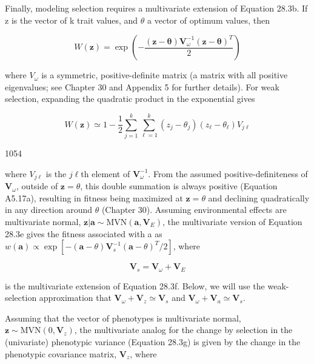 \documentclass{article}
\begin{document}
Finally, modeling selection requires a multivariate extension of Equation 28.3b. If z is the vector of k trait values, and  $ \theta $ a vector of optimum values, then

\begin{equation}
W(\mathbf{z})=\exp\left(-\frac{(\mathbf{z}-\boldsymbol{\theta})\mathbf{V}_{\omega}^{-1}(\mathbf{z}-\boldsymbol{\theta})^{T}}{2}\right)
\tag{28.36a}
\label{eq:28_36a}
\end{equation}

where  $ V_{\omega} $ is a symmetric, positive-definite matrix (a matrix with all positive eigenvalues; see Chapter 30 and Appendix 5 for further details). For weak selection, expanding the quadratic product in the exponential gives

\begin{equation}
W(\mathbf{z})\simeq1-\frac{1}{2}\sum_{j=1}^{k}\sum_{\ell=1}^{k}(z_{j}-\theta_{j})(z_{\ell}-\theta_{\ell})V_{j\ell}
\tag{28.36b}
\label{eq:28_36b}
\end{equation}

1054

where  $ V_{j\ell} $ is the  $ j\ell $th element of  $ \mathbf{V}_{\omega}^{-1} $. From the assumed positive-definiteness of  $ \mathbf{V}_{\omega} $, outside of  $ \mathbf{z} = \theta $, this double summation is always positive (Equation A5.17a), resulting in fitness being maximized at  $ \mathbf{z} = \theta $ and declining quadratically in any direction around  $ \theta $ (Chapter 30). Assuming environmental effects are multivariate normal,  $ \mathbf{z}|\mathbf{a} \sim \text{MVN}(\mathbf{a}, \mathbf{V}_E) $, the multivariate version of Equation 28.3e gives the fitness associated with a as  $ w(\mathbf{a}) \propto \exp[-(\mathbf{a} - \theta)\mathbf{V}_s^{-1}(\mathbf{a} - \theta)^T/2] $, where

\begin{equation}
\mathbf{V}_{s}=\mathbf{V}_{\omega}+\mathbf{V}_{E}
\tag{28.36c}
\label{eq:28_36c}
\end{equation}

is the multivariate extension of Equation 28.3f. Below, we will use the weak-selection approximation that  $ \mathbf{V}_\omega + \mathbf{V}_z \simeq \mathbf{V}_s $ and  $ \mathbf{V}_\omega + \mathbf{V}_a \simeq \mathbf{V}_s $.

Assuming that the vector of phenotypes is multivariate normal,  $ \mathbf{z} \sim \text{MVN}(0, \mathbf{V}_z) $, the multivariate analog for the change by selection in the (univariate) phenotypic variance (Equation 28.3g) is given by the change in the phenotypic covariance matrix,  $ \mathbf{V}_z $, where
\end{document}
